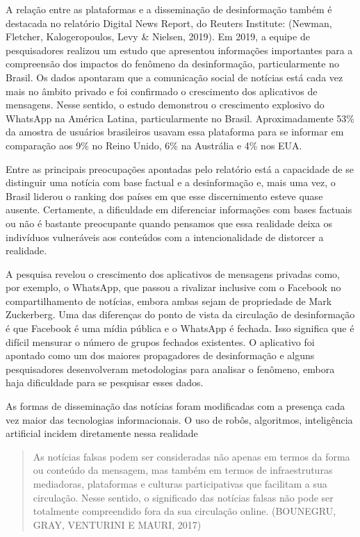 A relação entre as plataformas e a disseminação de desinformação também
é destacada no relatório Digital News Report, do Reuters Institute:
(Newman, Fletcher, Kalogeropoulos, Levy \& Nielsen, 2019). Em 2019, a
equipe de pesquisadores realizou um estudo que apresentou informações
importantes para a compreensão dos impactos do fenômeno da
desinformação, particularmente no Brasil. Os dados apontaram que a
comunicação social de notícias está cada vez mais no âmbito privado e
foi confirmado o crescimento dos aplicativos de mensagens. Nesse
sentido, o estudo demonstrou o crescimento explosivo do WhatsApp na
América Latina, particularmente no Brasil. Aproximadamente 53\% da
amostra de usuários brasileiros usavam essa plataforma para se informar
em comparação aos 9\% no Reino Unido, 6\% na Austrália e 4\% nos EUA.

Entre as principais preocupações apontadas pelo relatório está a
capacidade de se distinguir uma notícia com base factual e a
desinformação e, mais uma vez, o Brasil liderou o ranking dos países em
que esse discernimento esteve quase ausente. Certamente, a dificuldade
em diferenciar informações com bases factuais ou não é bastante
preocupante quando pensamos que essa realidade deixa os indivíduos
vulneráveis aos conteúdos com a intencionalidade de distorcer a
realidade.

A pesquisa revelou o crescimento dos aplicativos de mensagens privadas
como, por exemplo, o WhatsApp, que passou a rivalizar inclusive com o
Facebook no compartilhamento de notícias, embora ambas sejam de
propriedade de Mark Zuckerberg. Uma das diferenças do ponto de vista da
circulação de desinformação é que Facebook é uma mídia pública e o
WhatsApp é fechada. Isso significa que é difícil mensurar o número de
grupos fechados existentes. O aplicativo foi apontado como um dos
maiores propagadores de desinformação e alguns pesquisadores
desenvolveram metodologias para analisar o fenômeno, embora haja
dificuldade para se pesquisar esses dados.

As formas de disseminação das notícias foram modificadas com a presença
cada vez maior das tecnologias informacionais. O uso de robôs,
algoritmos, inteligência artificial incidem diretamente nessa realidade

\begin{quote}
As notícias falsas podem ser consideradas não apenas em termos da forma
ou conteúdo da mensagem, mas também em termos de infraestruturas
mediadoras, plataformas e culturas participativas que facilitam a sua
circulação. Nesse sentido, o significado das notícias falsas não pode
ser totalmente compreendido fora da sua circulação online. (BOUNEGRU,
GRAY, VENTURINI E MAURI, 2017)
\end{quote}

